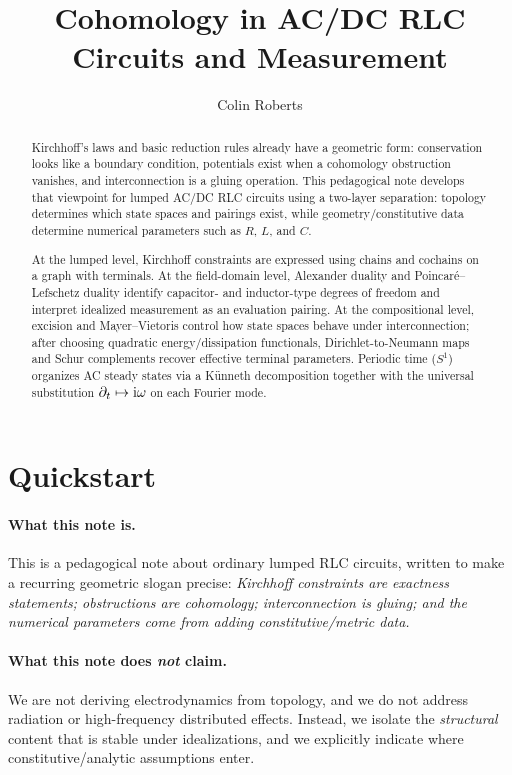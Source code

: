 \documentclass[11pt]{article}
\title{Cohomology in AC/DC RLC Circuits and Measurement}
\author{Colin Roberts}
\date{}
\begin{document}
\maketitle

\begin{abstract}
Kirchhoff's laws and basic reduction rules already have a geometric form: conservation looks like a boundary condition, potentials exist when a cohomology obstruction vanishes, and interconnection is a gluing operation.
This pedagogical note develops that viewpoint for lumped AC/DC RLC circuits using a two-layer separation: topology determines which state spaces and pairings exist, while geometry/constitutive data determine numerical parameters such as $R$, $L$, and $C$.

At the lumped level, Kirchhoff constraints are expressed using chains and cochains on a graph with terminals.
At the field-domain level, Alexander duality and Poincar\'e--Lefschetz duality identify capacitor- and inductor-type degrees of freedom and interpret idealized measurement as an evaluation pairing.
At the compositional level, excision and Mayer--Vietoris control how state spaces behave under interconnection; after choosing quadratic energy/dissipation functionals, Dirichlet-to-Neumann maps and Schur complements recover effective terminal parameters.
Periodic time ($S^1$) organizes AC steady states via a K\"unneth decomposition together with the universal substitution $\partial_t\mapsto \mathrm{i}\omega$ on each Fourier mode.
\end{abstract}

\tableofcontents

\section*{Quickstart}

\paragraph{What this note is.}
This is a pedagogical note about ordinary lumped RLC circuits, written to make a recurring geometric slogan precise:
\emph{Kirchhoff constraints are exactness statements; obstructions are cohomology; interconnection is gluing; and the numerical parameters come from adding constitutive/metric data.}

\paragraph{What this note does \emph{not} claim.}
We are not deriving electrodynamics from topology, and we do not address radiation or high-frequency distributed effects.
Instead, we isolate the \emph{structural} content that is stable under idealizations, and we explicitly indicate where constitutive/analytic assumptions enter.
\end{document}
